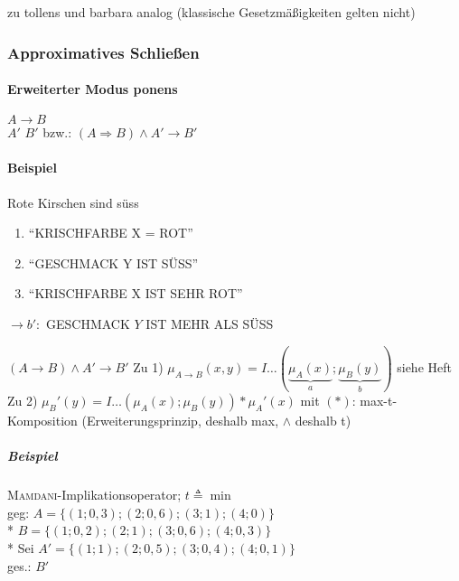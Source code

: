 \documentclass[a4paper]{scrartcl}
\begin{document}
zu tollens und barbara analog (klassische Gesetzmäßigkeiten gelten nicht)

\subsubsection{Approximatives Schließen}
\paragraph{Erweiterter Modus ponens}
$A \rightarrow B$\\
$A'$
$B'$
bzw.: $(A \Rightarrow B) \wedge A' \rightarrow B'$

\paragraph{Beispiel} Rote Kirschen sind süss
\begin{enumerate}
\item "`KRISCHFARBE  X = ROT"'
\item "`GESCHMACK Y IST  SÜSS"'
\item "`KRISCHFARBE X IST SEHR ROT"'
\end{enumerate}
$\rightarrow b' :$ GESCHMACK $Y$ IST MEHR ALS SÜSS

$(A \rightarrow B) \wedge A' \rightarrow B'$
Zu 1) $\mu_{A \rightarrow B} (x,y) = I \dots (\underbrace{\mu_A(x)}_{a};\underbrace{\mu_B(y)}_{b})$ siehe Heft\\
Zu 2) $\mu_B' (y) = I \dots (\mu_A(x);\mu_B(y)) \ast \mu_A'(x)$ mit $(\ast)$: max-t-Komposition (Erweiterungsprinzip, deshalb max, $\wedge$ deshalb t)

\subparagraph{Beispiel} \textsc{Mamdani}-Implikationsoperator; $t \triangleq \min$\\
geg: $A=\{ (1;0,3);(2;0,6);(3;1);(4;0)\}$\\*
$B = \{(1;0,2);(2;1);(3;0,6);(4;0,3)\}$\\*
Sei $A' = \{(1;1);(2;0,5);(3;0,4);(4;0,1)\}$\\
ges.: $B'$
\end{document}
